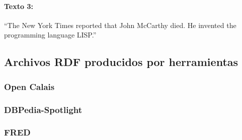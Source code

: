 \documentclass[spanish]{llncs}   %
\begin{document}
\paragraph{Texto 3:}
“The New York Times reported that John McCarthy died. He invented the programming language LISP.”

\subsection{Archivos RDF producidos por herramientas}

\subsubsection{Open Calais}\label{OpenCalaisRDF}
%
%
%

\subsubsection{DBPedia-Spotlight}\label{DBPediaRDF}
\subsubsection{FRED}\label{FREDRDF}
%
%
%
\end{document}
